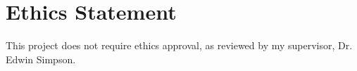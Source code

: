 \documentclass[ %
                    author={Aman Kumar Singh},
                supervisor={Dr. Edwin Simpson},
                    degree={MSc},
                     title={Quality-Aware Knowledge Distillation of Large Language Models for Efficient Personalised Clinical Report Generation},
                  subtitle={},
                      type={},
                      year={2021}]{dissertation}
\begin{document}








\maketitle


\frontmatter


\makedecl






\tableofcontents
\listoffigures
\listoftables
\chapter*{Ethics Statement}
 This project
does not require ethics approval,   
   as reviewed by my supervisor, Dr. Edwin Simpson. 
\end{document}
